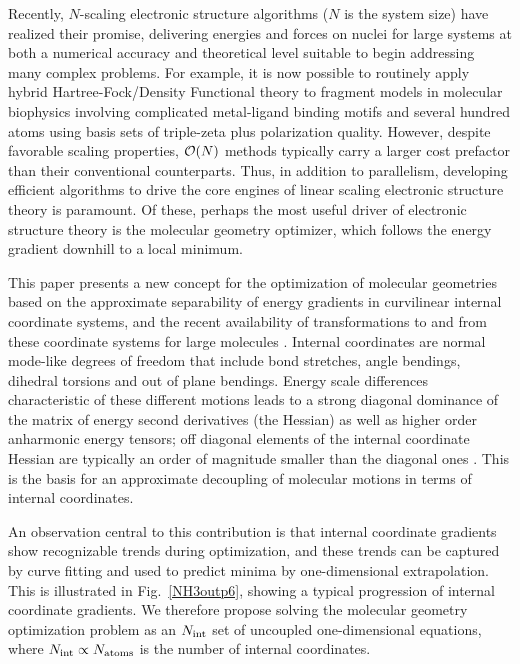 \documentclass[prl,twocolumn,showpacs,twocolumngrid,superbib]{revtex4}
\begin{document}
Recently, $N$-scaling electronic structure algorithms ($N$ is the system size)  have 
realized their promise, delivering energies and forces on nuclei for large systems at 
both a numerical accuracy and theoretical level suitable to begin addressing many complex 
problems.  For example, it is now possible to routinely apply hybrid Hartree-Fock/Density 
Functional theory to fragment models in molecular biophysics involving complicated 
metal-ligand binding motifs and several hundred atoms using basis sets of triple-zeta plus 
polarization quality.  However, despite favorable scaling properties, ${\cal O}(N)$ 
methods typically carry a larger cost prefactor than their conventional counterparts.  Thus, 
in addition to parallelism, developing efficient algorithms to drive the core engines of 
linear scaling electronic structure theory is paramount.  Of these, perhaps the most useful 
driver of electronic structure theory is the molecular geometry optimizer, which follows 
the energy gradient downhill to a local minimum.   

This paper presents a new concept for the optimization of molecular geometries based on
the approximate separability of energy gradients in curvilinear internal coordinate 
systems, and the recent availability of transformations to and from these coordinate systems 
for large molecules \cite{paizs_coordtrf1,nemeth_coordtrf1,paizs_coordtrf2,nemeth_coordtrf2}.  
Internal coordinates are normal mode-like degrees of freedom that include bond stretches, angle bendings, 
dihedral torsions and  out of plane bendings.  Energy scale differences characteristic of these 
different motions leads to a strong diagonal dominance of the matrix of energy second derivatives 
(the Hessian) as well as higher order anharmonic energy tensors;  off diagonal elements of the 
internal coordinate Hessian are typically an order of magnitude smaller than the diagonal ones
\cite{pulay_69,fogarasi_diaghess,Pulay_natural_internals,pulay_review,pulay_dynamics}.
This is the basis for an approximate decoupling of molecular motions in terms of internal coordinates.

An observation central to this contribution is that internal coordinate gradients show recognizable trends 
during optimization, and these trends can be captured by curve fitting and used to predict minima by 
one-dimensional extrapolation.  This is illustrated in Fig.~\ref{NH3outp6}, showing a typical progression of 
internal coordinate gradients.  We therefore propose solving the molecular geometry optimization problem as 
an $N_{\rm int}$ set of uncoupled one-dimensional equations, where $N_{\rm int} \propto N_{\rm atoms}$ is 
the number of internal coordinates. 
\end{document}
